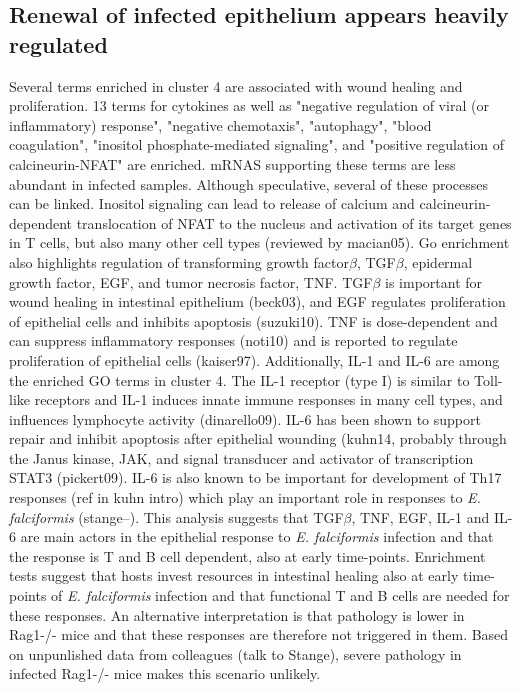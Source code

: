 \documentclass{bmcart}
\begin{document}
\subsection*{Renewal of infected epithelium appears heavily regulated}
Several terms enriched in cluster 4 are associated with wound healing and proliferation. 13 terms for cytokines as well as "negative regulation of viral (or inflammatory) response", "negative chemotaxis", "autophagy", "blood coagulation", "inositol phosphate-mediated signaling", and "positive regulation of calcineurin-NFAT" are enriched. mRNAS supporting these terms are less abundant in infected samples. Although speculative, several of these processes can be linked. Inositol signaling can lead to release of calcium and calcineurin-dependent translocation of NFAT to the nucleus and activation of its target genes in T cells, but also many other cell types (reviewed by macian05). Go enrichment also highlights regulation of transforming growth factor$\beta$, TGF$\beta$, epidermal growth factor, EGF, and tumor necrosis factor, TNF. TGF$\beta$ is important for wound healing in intestinal epithelium (beck03), and EGF regulates proliferation of epithelial cells and inhibits apoptosis (suzuki10). TNF is dose-dependent and can suppress inflammatory responses (noti10) and is reported to regulate proliferation of epithelial cells (kaiser97). Additionally, IL-1 and IL-6 are among the enriched GO terms in cluster 4. The IL-1 receptor (type I) is similar to Toll-like receptors and IL-1 induces innate immune responses in many cell types, and influences lymphocyte activity (dinarello09). IL-6 has been shown to support repair and inhibit apoptosis after epithelial wounding (kuhn14, probably through the Janus kinase, JAK, and signal transducer and activator of transcription STAT3 (pickert09). IL-6 is also known to be important for development of Th17 responses (ref in kuhn intro) which play an important role in responses to \textit{E. falciformis} (stange--). This analysis suggests that TGF$\beta$, TNF, EGF, IL-1 and IL-6 are main actors in the epithelial response to \textit{E. falciformis} infection and that the response is T and B cell dependent, also at early time-points. Enrichment tests suggest that hosts invest resources in intestinal healing also at early time-points of \textit{E. falciformis} infection and that functional T and B cells are needed for these responses. An alternative interpretation is that pathology is lower in Rag1-/- mice and that these responses are therefore not triggered in them. Based on unpunlished data from colleagues (talk to Stange), severe pathology in infected Rag1-/- mice makes this scenario unlikely.
\end{document}

